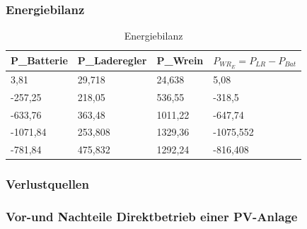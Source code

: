 \subsubsection{Energiebilanz}

\begin{table}[!ht]
\caption{Energiebilanz}
\begin{tabular}{|l|l|l|l|}
\hline
\rowcolor[HTML]{76B900} 
P\_Batterie & P\_Laderegler & P\_Wrein & $P_{WR_E} = P_{LR}-P_{Bat}$ \\ \hline
\rowcolor[HTML]{FFFFFF} 
3,81        & 29,718        & 24,638   & 5,08                        \\ \hline
\rowcolor[HTML]{C0C0C0} 
-257,25     & 218,05        & 536,55   & -318,5                      \\ \hline
-633,76     & 363,48        & 1011,22  & -647,74                     \\ \hline
\rowcolor[HTML]{C0C0C0} 
-1071,84    & 253,808       & 1329,36  & -1075,552                   \\ \hline
-781,84     & 475,832       & 1292,24  & -816,408                    \\ \hline
\end{tabular}
\label{tab:230514_Energiebilanz}
\end{table}

\subsubsection{Verlustquellen}
\subsubsection{Vor-und Nachteile Direktbetrieb einer PV-Anlage}